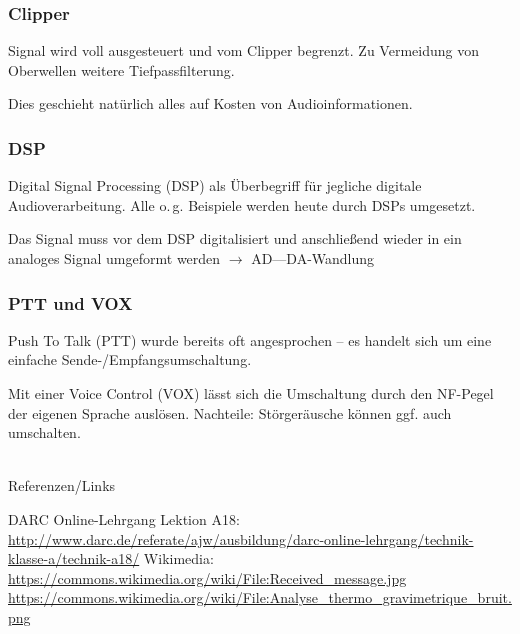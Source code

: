 \begin{frame}
    \frametitle{Clipper}

    Signal wird voll ausgesteuert und vom Clipper begrenzt. Zu Vermeidung von
    Oberwellen weitere Tiefpassfilterung.

    \bigskip

    Dies geschieht natürlich alles auf Kosten von Audioinformationen.

\end{frame}

\begin{frame}
    \frametitle{DSP}

    Digital Signal Processing (DSP) als Überbegriff für jegliche digitale
    Audioverarbeitung. Alle o.\,g. Beispiele werden heute durch DSPs umgesetzt.

    \bigskip

    Das Signal muss vor dem DSP digitalisiert und anschließend wieder in ein
    analoges Signal umgeformt werden $\rightarrow$ AD---DA-Wandlung

\end{frame}

\begin{frame}
    \frametitle{PTT und VOX}

    Push To Talk (PTT) wurde bereits oft angesprochen -- es handelt sich um eine
    einfache Sende-/Empfangsumschaltung.

    \bigskip

    Mit einer Voice Control (VOX) lässt sich die Umschaltung durch den NF-Pegel
    der eigenen Sprache auslösen. Nachteile: Störgeräusche können ggf. auch
    umschalten.

\end{frame}

\renewcommand{\refname}{Referenzen}

\hypertarget{refs}{}
\textcolor{white}{} \\ %
\Large Referenzen/Links
\footnotesize

\begin{thebibliography}{}
      DARC Online-Lehrgang Lektion A18:\\
                    \url{http://www.darc.de/referate/ajw/ausbildung/darc-online-lehrgang/technik-klasse-a/technik-a18/}
        Wikimedia:\\
                    \url{https://commons.wikimedia.org/wiki/File:Received_message.jpg}\\
                    \url{https://commons.wikimedia.org/wiki/File:Analyse_thermo_gravimetrique_bruit.png}
\end{thebibliography}


